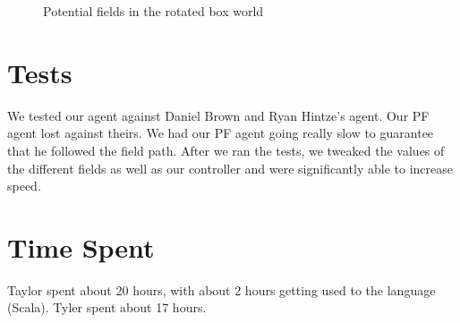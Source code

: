 \documentclass[11pt]{article}
\begin{document}
\begin{figure}[h]
	\caption{Potential fields in the rotated box world}
\end{figure}

\section{Tests}
We tested our agent against Daniel Brown and Ryan Hintze's agent.
Our PF agent lost against theirs.
We had our PF agent going really slow to guarantee that he followed the field path.
After we ran the tests, we tweaked the values of the different fields as well as our controller and were significantly able to increase speed.

\section{Time Spent}
Taylor spent about 20 hours, with about 2 hours getting used to the language (Scala).
Tyler spent about 17 hours.
\end{document}
